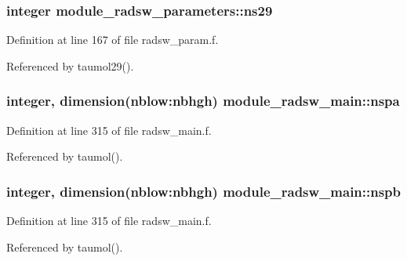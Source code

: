 \subsubsection[{\texorpdfstring{ns29}{ns29}}]{\setlength{\rightskip}{0pt plus 5cm}integer module\+\_\+radsw\+\_\+parameters\+::ns29}\hypertarget{group__module__radsw__main_gae966fc99ad683e9e0ee30f792db413fc}{}\label{group__module__radsw__main_gae966fc99ad683e9e0ee30f792db413fc}


Definition at line 167 of file radsw\+\_\+param.\+f.



Referenced by taumol29().

\subsubsection[{\texorpdfstring{nspa}{nspa}}]{\setlength{\rightskip}{0pt plus 5cm}integer, dimension(nblow\+:nbhgh) module\+\_\+radsw\+\_\+main\+::nspa\hspace{0.3cm}{\ttfamily [private]}}\hypertarget{group__module__radsw__main_ga4c0fc140a51c619089128f52e4bb878c}{}\label{group__module__radsw__main_ga4c0fc140a51c619089128f52e4bb878c}


Definition at line 315 of file radsw\+\_\+main.\+f.



Referenced by taumol().

\subsubsection[{\texorpdfstring{nspb}{nspb}}]{\setlength{\rightskip}{0pt plus 5cm}integer, dimension(nblow\+:nbhgh) module\+\_\+radsw\+\_\+main\+::nspb\hspace{0.3cm}{\ttfamily [private]}}\hypertarget{group__module__radsw__main_ga6be022a4a1ae32248d9721a9fff93db6}{}\label{group__module__radsw__main_ga6be022a4a1ae32248d9721a9fff93db6}


Definition at line 315 of file radsw\+\_\+main.\+f.



Referenced by taumol().

